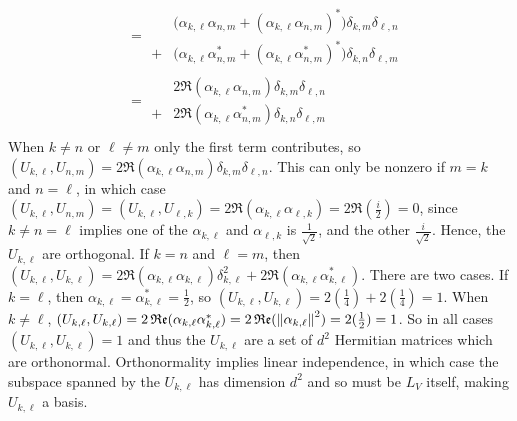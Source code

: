 \begin{align*}
&= \begin{array}{cc}&\bigl(\alpha_{k,\ell}\alpha_{n,m}+(\alpha_{k,\ell}\alpha_{n,m})^*\bigr)\delta_{k,m}\delta_{\ell,n} \\ +& \bigl(\alpha_{k,\ell}\alpha_{n,m}^* + (\alpha_{k,\ell}\alpha_{n,m}^*)^*\bigr)\delta_{k,n}\delta_{\ell,m}
\end{array} \tag{group like $\delta$s, property of $^*$} \\
&= \begin{array}{cc}&2\Re(\alpha_{k,\ell}\alpha_{n,m})\delta_{k,m}\delta_{\ell,n} \\+& 2\Re(\alpha_{k,\ell}\alpha_{n,m}^*)\delta_{k,n}\delta_{\ell,m} \end{array} \tag{property of $^*$} \\
\end{align*}
\endgroup
\noindent When $k\neq n$ or $\ell \neq m$ only the first term contributes, so $(U_{k,\ell}, U_{n, m}) = 2\Re(\alpha_{k,\ell}\alpha_{n,m})\delta_{k,m}\delta_{\ell,n}$.  This can only be nonzero if $m=k$ and $n=\ell$, in which case  $(U_{k,\ell}, U_{n, m}) = (U_{k,\ell}, U_{\ell, k}) =  2\Re(\alpha_{k,\ell}\alpha_{\ell,k}) = 2\Re(\frac{i}{2}) = 0$, since $k\neq n = \ell$ implies one of the $\alpha_{k,\ell}$ and $\alpha_{\ell,k}$ is $\frac{1}{\sqrt{2}}$, and the other 
$\frac{i}{\sqrt{2}}$.  Hence, the $U_{k,\ell}$ are orthogonal.  If $k=n$ and $\ell=m$, then $(U_{k,\ell}, U_{k,\ell}) = 2\Re(\alpha_{k,\ell}\alpha_{k,\ell})\delta_{k,\ell}^2 + 2\Re(\alpha_{k,\ell}\alpha_{k,\ell}^*)$.  There are two cases.  If $k=\ell$, then $\alpha_{k,\ell} = \alpha_{k,\ell}^* =\frac{1}{2}$, so $(U_{k,\ell}, U_{k,\ell}) = 2(\frac{1}{4})+2(\frac{1}{4}) = 1$.  When $k\neq\ell$, $(U_{k,\ell}, U_{k,\ell}) = 2\operatorname{\mathfrak{Re}}(\alpha_{k,\ell}\alpha_{k,\ell}^*) = 2\operatorname{\mathfrak{Re}}(\left\lVert\alpha_{k,\ell}\right\rVert^2) = 2(\frac{1}{2}) = 1$.  So in all cases $(U_{k,\ell}, U_{k,\ell}) = 1$ and thus the $U_{k,\ell}$ are a set of $d^2$ Hermitian matrices which are orthonormal.  Orthonormality implies linear independence, in which case the subspace spanned by the $U_{k,\ell}$ has dimension $d^2$ and so must be $L_V$ itself, making $U_{k,\ell}$ a basis.

